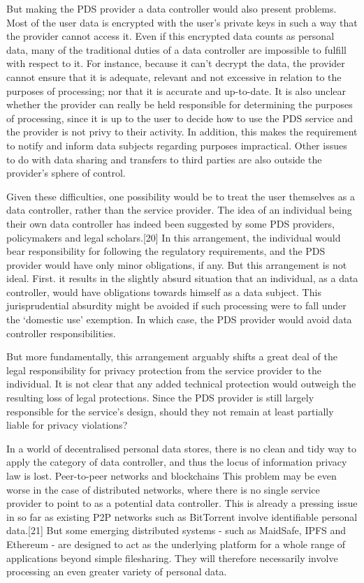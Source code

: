 \documentclass{acm_proc_article-sp}
\begin{document}
But making the PDS provider a data controller would also present problems. Most of the user data is encrypted with the user’s private keys in such a way that the provider cannot access it. Even if this encrypted data counts as personal data, many of the traditional duties of a data controller are impossible to fulfill with respect to it. For instance, because it can’t decrypt the data, the provider cannot ensure that it is adequate, relevant and not excessive in relation to the purposes of processing; nor that it is accurate and up-to-date. It is also unclear whether the provider can really be held responsible for determining the purposes of processing, since it is up to the user to decide how to use the PDS service and the provider is not privy to their activity. In addition, this makes the requirement to notify and inform data subjects regarding purposes impractical. Other issues to do with data sharing and transfers to third parties are also outside the provider’s sphere of control.
 
Given these difficulties, one possibility would be to treat the user themselves as a data controller, rather than the service provider. The idea of an individual being their own data controller has indeed been suggested by some PDS providers, policymakers and legal scholars.[20] In this arrangement, the individual would bear responsibility for following the regulatory requirements, and the PDS provider would have only minor obligations, if any. But this arrangement is not ideal. First. it results in the slightly absurd situation that an individual, as a data controller, would have obligations towards himself as a data subject. This jurisprudential absurdity might be avoided if such processing were to fall under the ‘domestic use’ exemption. In which case, the PDS provider would avoid data controller responsibilities.
 
 
 
But more fundamentally, this arrangement arguably shifts a great deal of the legal responsibility for privacy protection from the service provider to the individual. It is not clear that any added technical protection would outweigh the resulting loss of legal protections. Since the PDS provider is still largely responsible for the service’s design, should they not remain at least partially liable for privacy violations?
 
In a world of decentralised personal data stores, there is no clean and tidy way to apply the category of data controller, and thus the locus of information privacy law is lost.
Peer-to-peer networks and blockchains
This problem may be even worse in the case of distributed networks, where there is no single service provider to point to as a potential data controller. This is already a pressing issue in so far as existing P2P networks such as BitTorrent involve identifiable personal data.[21] But some emerging distributed systems - such as MaidSafe, IPFS and Ethereum - are designed to act as the underlying platform for a whole range of applications beyond simple filesharing. They will therefore necessarily involve processing an even greater variety of personal data.
 
\end{document}
